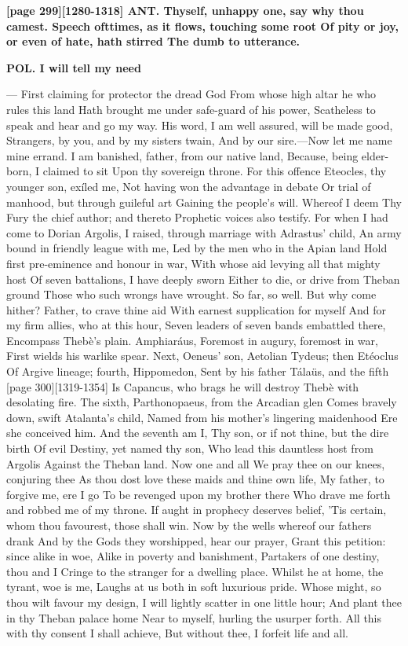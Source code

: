 \documentclass[11pt,letter]{book}
\begin{document}
\par \textbf{[page 299][1280-1318] ANT. Thyself, unhappy one, say why thou camest. Speech ofttimes, as it flows, touching some root Of pity or joy, or even of hate, hath stirred The dumb to utterance.}
\par 

\par \textbf{POL. I will tell my need}
\par  — First claiming for protector the dread God From whose high altar he who rules this land Hath brought me under safe-guard of his power, Scatheless to speak and hear and go my way. His word, I am well assured, will be made good, Strangers, by you, and by my sisters twain, And by our sire.—Now let me name mine errand. I am banished, father, from our native land, Because, being elder-born, I claimed to sit Upon thy sovereign throne. For this offence Eteocles, thy younger son, exíled me, Not having won the advantage in debate Or trial of manhood, but through guileful art Gaining the people’s will. Whereof I deem Thy Fury the chief author; and thereto Prophetic voices also testify. For when I had come to Dorian Argolis, I raised, through marriage with Adrastus’ child, An army bound in friendly league with me, Led by the men who in the Apian land Hold first pre-eminence and honour in war, With whose aid levying all that mighty host Of seven battalions, I have deeply sworn Either to die, or drive from Theban ground Those who such wrongs have wrought. So far, so well. But why come hither? Father, to crave thine aid With earnest supplication for myself And for my firm allies, who at this hour, Seven leaders of seven bands embattled there, Encompass Thebè’s plain. Amphiaráus, Foremost in augury, foremost in war, First wields his warlike spear. Next, Oeneus’ son, Aetolian Tydeus; then Etéoclus Of Argive lineage; fourth, Hippomedon, Sent by his father Tálaüs, and the fifth [page 300][1319-1354] Is Capancus, who brags he will destroy Thebè with desolating fire. The sixth, Parthonopaeus, from the Arcadian glen Comes bravely down, swift Atalanta’s child, Named from his mother’s lingering maidenhood Ere she conceived him. And the seventh am I, Thy son, or if not thine, but the dire birth Of evil Destiny, yet named thy son, Who lead this dauntless host from Argolis Against the Theban land. Now one and all We pray thee on our knees, conjuring thee As thou dost love these maids and thine own life, My father, to forgive me, ere I go To be revenged upon my brother there Who drave me forth and robbed me of my throne. If aught in prophecy deserves belief, ’Tis certain, whom thou favourest, those shall win. Now by the wells whereof our fathers drank And by the Gods they worshipped, hear our prayer, Grant this petition:  since alike in woe, Alike in poverty and banishment, Partakers of one destiny, thou and I Cringe to the stranger for a dwelling place. Whilst he at home, the tyrant, woe is me, Laughs at us both in soft luxurious pride. Whose might, so thou wilt favour my design, I will lightly scatter in one little hour; And plant thee in thy Theban palace home Near to myself, hurling the usurper forth. All this with thy consent I shall achieve, But without thee, I forfeit life and all.
\end{document}
